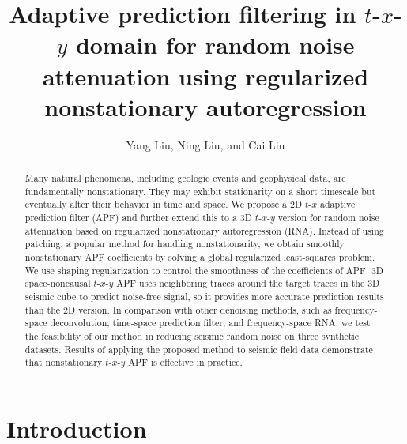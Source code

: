 
\title{Adaptive prediction filtering in $t$-$x$-$y$ domain for random noise attenuation using regularized nonstationary autoregression}

\address{
College of Geo-exploration Science and Technology,\\
Jilin University \\
No.938 Xi minzhu street \\
Changchun, China, 130026}

\author{Yang Liu, Ning Liu, and Cai Liu}

\maketitle

\begin{abstract}
Many natural phenomena, including geologic events and geophysical
data, are fundamentally nonstationary. They may exhibit stationarity
on a short timescale but eventually alter their behavior in time and
space. We propose a 2D $t$-$x$ adaptive prediction filter (APF) and
further extend this to a 3D $t$-$x$-$y$ version for random noise
attenuation based on regularized nonstationary autoregression
(RNA). Instead of using patching, a popular method for handling
nonstationarity, we obtain smoothly nonstationary APF coefficients by
solving a global regularized least-squares problem. We use shaping
regularization to control the smoothness of the coefficients of
APF. 3D space-noncausal $t$-$x$-$y$ APF uses neighboring traces around
the target traces in the 3D seismic cube to predict noise-free signal,
so it provides more accurate prediction results than the 2D
version. In comparison with other denoising methods, such as
frequency-space deconvolution, time-space prediction filter, and
frequency-space RNA, we test the feasibility of our method in reducing
seismic random noise on three synthetic datasets. Results of applying
the proposed method to seismic field data demonstrate that
nonstationary $t$-$x$-$y$ APF is effective in practice.

\end{abstract}

\section{Introduction}

